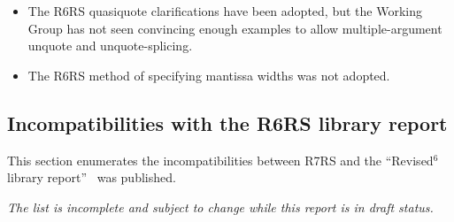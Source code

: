 \begin{itemize}
\item The R6RS {\cf quasiquote} clarifications have been adopted, but the Working Group has not seen
convincing enough examples to allow multiple-argument {\cf unquote} and
{\cf unquote-splicing}.

\item The R6RS method of specifying mantissa widths was not adopted.

\end{itemize}

\subsection*{Incompatibilities with the R6RS library report}

This section enumerates the incompatibilities between R7RS and
the ``Revised$^6$ library report''~\cite{R6RS-lib} was published.

{\em The list is incomplete and subject to change while this report is in draft status.}

